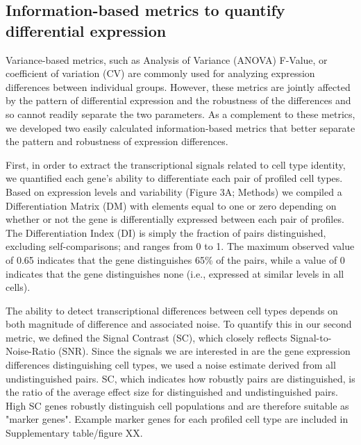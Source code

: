 \subsection{Information-based metrics to quantify differential expression}

Variance-based metrics, such as Analysis of Variance (ANOVA) F-Value, or coefficient of variation (CV) are commonly used for analyzing expression differences between individual groups. However, these metrics are jointly affected by the pattern of differential expression and the robustness of the differences and so cannot readily separate the two parameters. As a complement to these metrics, we developed two easily calculated information-based metrics that better separate the pattern and robustness of expression differences. 

First, in order to extract the transcriptional signals related to cell type identity, we quantified each gene's ability to differentiate each pair of profiled cell types. Based on expression levels and variability (Figure 3A; Methods) we compiled a Differentiation Matrix (DM) with elements equal to one or zero depending on whether or not the gene is differentially expressed between each pair of profiles. The Differentiation Index (DI) is simply the fraction of pairs distinguished, excluding self-comparisons; and ranges from 0 to 1. The maximum observed value of 0.65 indicates that the gene distinguishes 65\% of the pairs, while a value of 0 indicates that the gene distinguishes none (i.e., expressed at similar levels in all cells). 

The ability to detect transcriptional differences between cell types depends on both magnitude of difference and associated noise. To quantify this in our second metric, we defined the Signal Contrast (SC), which closely reflects Signal-to-Noise-Ratio (SNR). Since the signals we are interested in are the gene expression differences distinguishing cell types, we used a noise estimate derived from all undistinguished pairs. SC, which indicates how robustly pairs are distinguished, is the ratio of the average effect size for distinguished and undistinguished pairs. High SC genes robustly distinguish cell populations and are therefore suitable as "marker genes". Example marker genes for each profiled cell type are included in Supplementary table/figure XX.

